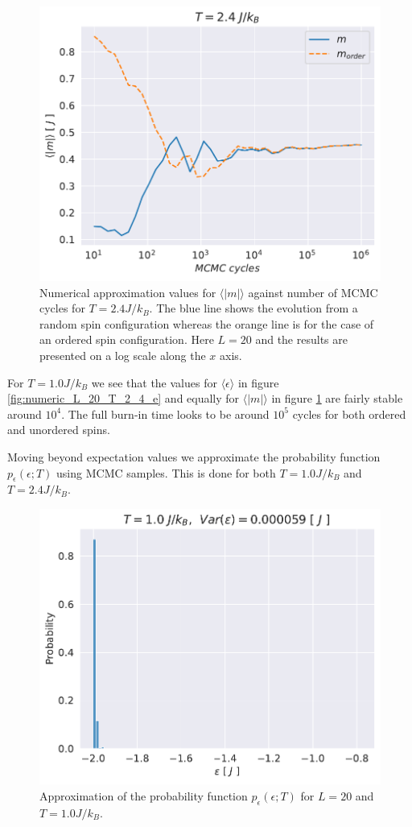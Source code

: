\documentclass[english,notitlepage,reprint,nofootinbib]{revtex4-1}  %
\begin{document}
\begin{figure}[H]
    \centering
    \includegraphics[width=.5\textwidth]{../figures/numeric_L_20_T_2_4_m.pdf}
    \caption{Numerical approximation values for $\langle |m| \rangle$ against number of MCMC cycles for $T=2.4 J/k_B$. The blue line shows the evolution from a random spin configuration whereas the orange line is for the case of an ordered spin configuration. Here $L=20$ and the results are presented on a log scale along the $x$ axis.}
    \label{fig:numeric_L_20_T_2_4_m}
\end{figure}
For $T=1.0J/k_B$ we see that the values for $\langle \epsilon \rangle$ in figure \ref{fig:numeric_L_20_T_2_4_e} and equally for $\langle |m| \rangle$ in figure \ref{fig:numeric_L_20_T_2_4_m} are fairly stable around $10^4$. The full burn-in time looks to be around $10^5$ cycles for both ordered and unordered spins.

Moving beyond expectation values we approximate the probability function $p_{\epsilon}(\epsilon ; T)$ using MCMC samples. This is done for both $T=1.0J/k_B$ and $T=2.4J/k_B$.
\begin{figure}[H]
    \centering
    \includegraphics[width=.5\textwidth]{../figures/histogram_T_1_m.pdf}
    \caption{Approximation of the probability function $p_{\epsilon}(\epsilon ; T)$ for $L=20$ and $T=1.0 J/k_B$.}
    \label{fig:histogram_T_1_m}
\end{figure}
\end{document}
